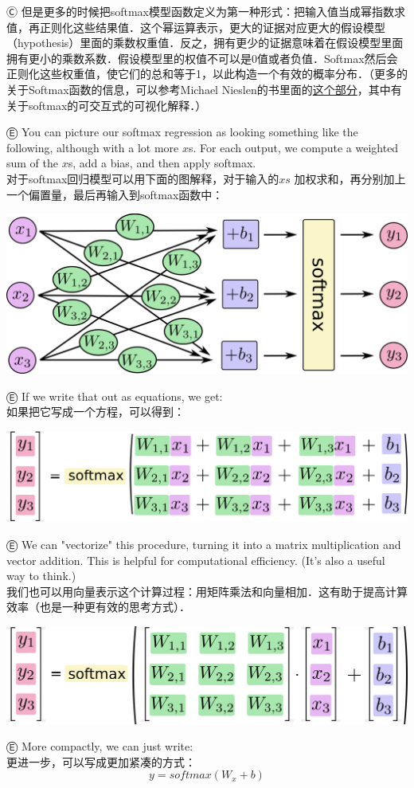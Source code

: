 Ⓒ 但是更多的时候把softmax模型函数定义为第一种形式：把输入值当成幂指数求值，再正则化这些结果值．这个幂运算表示，更大的证据对应更大的假设模型（hypothesis）里面的乘数权重值．反之，拥有更少的证据意味着在假设模型里面拥有更小的乘数系数．假设模型里的权值不可以是0值或者负值．Softmax然后会正则化这些权重值，使它们的总和等于1，以此构造一个有效的概率分布．（更多的关于Softmax函数的信息，可以参考Michael Nieslen的书里面的\href{http://neuralnetworksanddeeplearning.com/chap3.html#softmax}{这个部分}，其中有关于softmax的可交互式的可视化解释．）

Ⓔ You can picture our softmax regression as looking something like the following, although with a lot more $x$s. For each output, we compute a weighted sum of the $x$s, add a bias, and then apply softmax.\\
对于softmax回归模型可以用下面的图解释，对于输入的$xs$ 加权求和，再分别加上一个偏置量，最后再输入到softmax函数中：
\begin{center}
\includegraphics[width=.65\textwidth]{../SOURCE/images/softmax-regression-scalargraph.png}
\end{center}
Ⓔ If we write that out as equations, we get:\\
如果把它写成一个方程，可以得到：
\begin{center}
\includegraphics[width=.68\textwidth]{../SOURCE/images/softmax-regression-scalarequation.png}
\end{center}
Ⓔ We can "vectorize" this procedure, turning it into a matrix multiplication and vector addition. This is helpful for computational efficiency. (It's also a useful way to think.)\\
我们也可以用向量表示这个计算过程：用矩阵乘法和向量相加．这有助于提高计算效率（也是一种更有效的思考方式）．
\begin{center}
\includegraphics[width=.68\textwidth]{../SOURCE/images/softmax-regression-vectorequation.png}
\end{center}
Ⓔ More compactly, we can just write:\\
更进一步，可以写成更加紧凑的方式：
\begin{equation}
y = softmax(W_x+b)
\end{equation}

